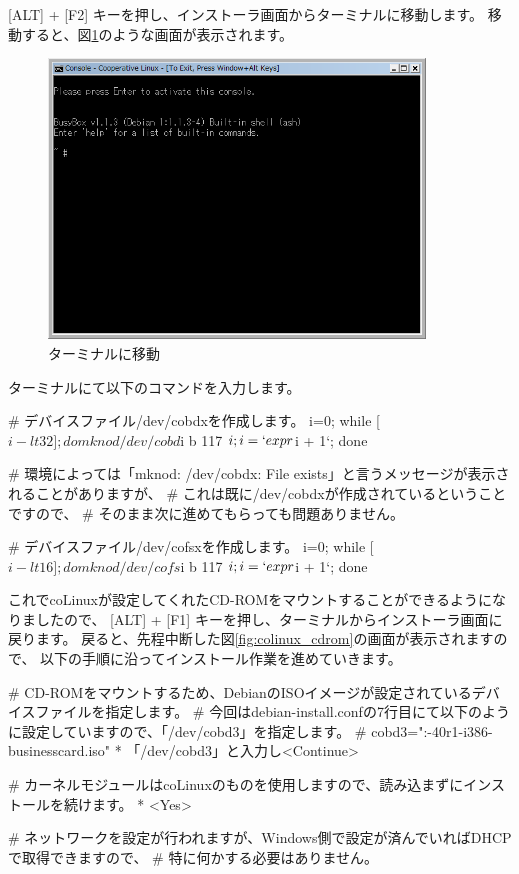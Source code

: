 \documentclass[mingoth,a4paper]{jsarticle}
\begin{document}
[ALT] + [F2] キーを押し、インストーラ画面からターミナルに移動します。
移動すると、図\ref{fig:colinux_secound_console}のような画面が表示されます。

\begin{figure}[htbp]
 \begin{center}
  \includegraphics[width=100mm]{image200808/colinux_secound_console.png}
 \end{center}
 \caption{ターミナルに移動}
 \label{fig:colinux_secound_console}
\end{figure}

ターミナルにて以下のコマンドを入力します。

\begin{commandline}
# デバイスファイル/dev/cobdxを作成します。
i=0; while [ $i -lt 32 ]; do mknod /dev/cobd$i b 117 $i; i=`expr $i + 1`; done

# 環境によっては「mknod: /dev/cobdx: File exists」と言うメッセージが表示されることがありますが、
# これは既に/dev/cobdxが作成されているということですので、
# そのまま次に進めてもらっても問題ありません。

# デバイスファイル/dev/cofsxを作成します。
i=0; while [ $i -lt 16 ]; do mknod /dev/cofs$i b 117 $i; i=`expr $i + 1`; done
\end{commandline}

これでcoLinuxが設定してくれたCD-ROMをマウントすることができるようになりましたので、
[ALT] + [F1] キーを押し、ターミナルからインストーラ画面に戻ります。
戻ると、先程中断した図\ref{fig:colinux_cdrom}の画面が表示されますので、
以下の手順に沿ってインストール作業を進めていきます。

\begin{commandline}
# CD-ROMをマウントするため、DebianのISOイメージが設定されているデバイスファイルを指定します。
# 今回はdebian-install.confの7行目にて以下のように設定していますので、「/dev/cobd3」を指定します。
# cobd3="\DosDevices\C:\software\coLinux\debian-40r1-i386-businesscard.iso"
* 「/dev/cobd3」と入力し<Continue>

# カーネルモジュールはcoLinuxのものを使用しますので、読み込まずにインストールを続けます。
* <Yes>

# ネットワークを設定が行われますが、Windows側で設定が済んでいればDHCPで取得できますので、
# 特に何かする必要はありません。
\end{commandline}
\end{document}
